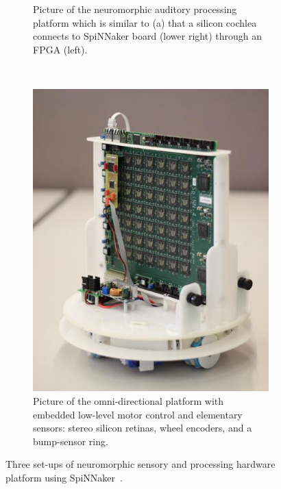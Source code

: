 \begin{figure}[tbp!]
\begin{subfigure}[t]{0.528\textwidth}
		\caption{Picture of the neuromorphic auditory processing platform which is similar to (a) \protect{} that a silicon cochlea \protect{} \protect{} connects to \protect{} SpiNNaker board (lower right) through an FPGA (left).}
	\end{subfigure}
	~~
	\begin{subfigure}[t]{0.4\textwidth}
		\includegraphics[width=\textwidth]{pics_snn/omnibot.jpg}
		\caption{Picture of the omni-directional platform with embedded low-level motor control and elementary sensors: stereo silicon retinas, wheel encoders, and a bump-sensor ring.}
	\end{subfigure}
	\caption{Three set-ups of neuromorphic sensory and processing hardware platform using SpiNNaker~\citep{furber2014spinnaker}.}
	\label{Fig:close-loop}
\end{figure}

